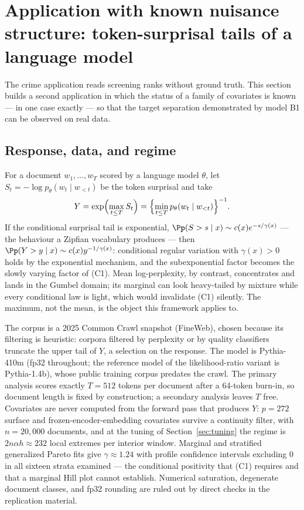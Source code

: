 \section{Application with known nuisance structure: token-surprisal tails
of a language model}\label{sec:llm}

The crime application reads screening ranks without ground truth. This
section builds a second application in which the status of a family of
covariates is known --- in one case exactly --- so that the target
separation demonstrated by model B1 can be observed on real data.

\subsection{Response, data, and regime}

For a document $w_1,\ldots,w_T$ scored by a language model $\theta$, let
$S_t=-\log p_\theta(w_t\mid w_{<t})$ be the token surprisal and take
\[
 Y=\exp\Bigl(\max_{t\le T}S_t\Bigr)
 =\Bigl\{\min_{t\le T}p_\theta(w_t\mid w_{<t})\Bigr\}^{-1}.
\]
If the conditional surprisal tail is exponential,
$\Pp(S>s\mid x)\sim c(x)e^{-s/\gamma(x)}$ --- the behaviour a Zipfian
vocabulary produces --- then
$\Pp(Y>y\mid x)\sim c(x)y^{-1/\gamma(x)}$: conditional regular variation
with $\gamma(x)>0$ holds by the exponential mechanism, and the
subexponential factor becomes the slowly varying factor of (C1). Mean
log-perplexity, by contrast, concentrates and lands in the Gumbel
domain; its marginal can look heavy-tailed by mixture while every
conditional law is light, which would invalidate (C1) silently. The
maximum, not the mean, is the object this framework applies to.

The corpus is a 2025 Common Crawl snapshot (FineWeb), chosen because its
filtering is heuristic: corpora filtered by perplexity or by quality
classifiers truncate the upper tail of $Y$, a selection on the response.
The model is Pythia-410m (fp32 throughout; the reference model of the
likelihood-ratio variant is Pythia-1.4b), whose public training corpus
predates the crawl. The primary analysis scores exactly $T=512$ tokens
per document after a 64-token burn-in, so document length is fixed by
construction; a secondary analysis leaves $T$ free. Covariates are never
computed from the forward pass that produces $Y$: $p=272$ surface and
frozen-encoder-embedding covariates survive a continuity filter, with
$n=20{,}000$ documents, and at the tuning of
Section~\ref{sec:tuning} the regime is $2n\alpha h\approx232$ local
extremes per interior window. Marginal and stratified generalized
Pareto fits give $\gamma\approx1.24$ with profile confidence intervals
excluding $0$ in all sixteen strata examined --- the conditional
positivity that (C1) requires and that a marginal Hill plot cannot
establish. Numerical saturation, degenerate document classes, and
fp32 rounding are ruled out by direct checks in the replication
material.

